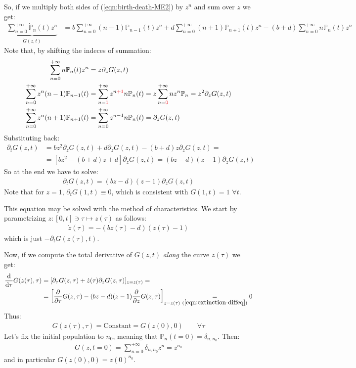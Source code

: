 \documentclass[../../main.tex]{subfiles}
\begin{document}
So, if we multiply both sides of (\ref{eqn:birth-death-ME2}) by $z^n$ and sum over $z$ we get:
\begin{align*}
    \underbrace{\sum_{n=0}^{+\infty} \dot{\mathbb{P}}_n(t) z^n}_{\dot{G}(z,t)}  &= b\sum_{n=0}^{+\infty} (n-1) \mathbb{P}_{n-1}(t) z^n + d\sum_{n=0}^{+\infty} (n+1) \mathbb{P}_{n+1}(t) z^n - (b+d)\sum_{n=0}^{+\infty} n \mathbb{P}_n(t) z^n
\end{align*}
Note that, by shifting the indeces of summation:
\begin{align*}
    \sum_{n=0}^{+\infty} n \mathbb{P}_n(t) z^n &= z\partial_z G(z,t)\\
    \sum_{n=0}^{+\infty} z^n(n-1) \mathbb{P}_{n-1}(t) &= \sum_{n=\textcolor{Red}{1}}^{+\infty} z^{n\textcolor{Red}{+1}} n \mathbb{P}_n(t) = z \sum_{n=\textcolor{Red}{0}}^{+\infty} n z^n \mathbb{P}_n = z^2 \partial_z G(z,t)\\
    \sum_{n=0}^{+\infty} z^n(n+1) \mathbb{P}_{n+1}(t) &= \sum_{n=0}^{+\infty} z^{n-1} n \mathbb{P}_n(t) = \partial_z G(z,t)
\end{align*}
Substituting back:
\begin{align*}
    \partial_t G(z,t) &= b z^2 \partial_z G(z,t) + d \partial_z G(z,t) - (b + d) z \partial_z G(z,t) =\\
    &= [b z^2 - (b+d)z + d]\partial_z G(z,t) = (bz - d)(z-1) \partial_z G(z,t)
\end{align*}
So at the end we have to solve:
\begin{align}\label{eqn:extinction-diffeq}
    \partial_t G(z,t) = (bz - d) (z-1) \partial_z G(z,t)
\end{align}
Note that for $z=1$, $\partial_t G(1,t) \equiv 0$, which is consistent with $G(1,t) = 1$ $\forall t$.


This equation may be solved with the method of characteristics. We start by parametrizing $z\colon [0,t] \ni \tau \mapsto z(\tau)$ as follows:
\begin{align}\label{eqn:z-tau}
    \dot{z}(\tau) = -(b z(\tau) - d) (z(\tau) - 1)
\end{align}
which is just $-\partial_t G(z(\tau),t)$. 

Now, if we compute the total derivative of $G(z,t)$ \textit{along} the curve $z(\tau)$ we get:
\begin{align*}
    \dv{\tau} G(z(\tau), \tau) &= [\partial_\tau G(z,\tau) + \dot{z}(\tau) \partial_z G(z, \tau)]_{z=z(\tau)} =\\
    &= \left[\pdv{\tau} G(z,\tau) - (bz - d)(z-1) \pdv{z} G(z,\tau)\right]_{z = z(\tau)} \underset{(\ref{eqn:extinction-diffeq})}{=} 0
\end{align*} 
Thus:
\begin{align}\label{eqn:G-along-curve}
    G(z(\tau), \tau) = \text{Constant} = G(z(0), 0) \qquad \forall \tau
\end{align}
Let's fix the initial population to $n_0$, meaning that $\mathbb{P}_n(t=0) = \delta_{n,n_0}$. Then:
\begin{align*}
    G(z,t=0) = \sum_{n=0}^{+\infty} \delta_{n, n_0} z^n = z^{n_0}
\end{align*}
and in particular $G(z(0),0) = z(0)^{n_0}$. 
\end{document}
